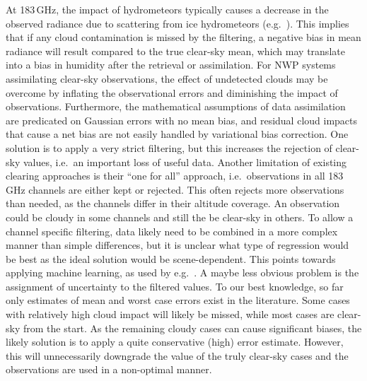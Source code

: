 \documentclass[amt, manuscript]{copernicus}
\begin{document}
At 183\,GHz, the impact of hydrometeors typically causes a decrease in the observed radiance due to scattering from ice hydrometeors (e.g.\ \citet{barlakas:three:20}). This implies that if any cloud contamination is missed by the filtering, a negative bias in mean radiance will result compared to the true clear-sky mean, which may translate into a bias in humidity after the retrieval or assimilation. For NWP systems assimilating clear-sky observations, the effect of undetected clouds may be overcome by inflating the observational errors and diminishing the impact of observations. Furthermore, the mathematical assumptions of data assimilation are predicated on Gaussian errors with no mean bias, and residual cloud impacts that cause a net bias are not easily handled by variational bias correction. One solution is to apply a very strict filtering, but this increases the rejection of clear-sky values, i.e.\ an important loss of useful data. Another limitation of existing clearing approaches is their ``one for all'' approach, i.e.\ observations in all 183\,GHz channels are either kept or rejected. This often rejects more observations than needed, as the channels differ in their altitude coverage. An observation could be cloudy in some channels and still the be clear-sky in others. To allow a channel specific filtering, data likely need to be combined in a more complex manner than simple differences, but it is unclear what type of regression would be best as the ideal solution would be scene-dependent. This points towards applying machine learning, as used by e.g.\ \citet{favrichon2019detecting}. A maybe less obvious problem is the assignment of uncertainty to the filtered values. To our best knowledge, so far only estimates of mean and worst case errors exist in the literature. Some cases with relatively high cloud impact will likely be missed, while most cases are clear-sky from the start. As the remaining cloudy cases can cause significant biases, the likely solution is to apply a quite conservative (high) error estimate. However, this will unnecessarily downgrade the value of the truly clear-sky cases and the observations are used in a non-optimal manner.
\end{document}
